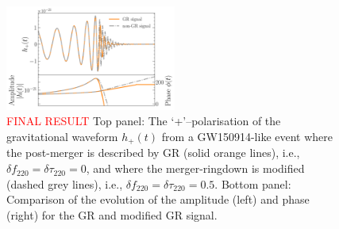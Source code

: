 \documentclass[twocolumn,prd,superscriptaddress,amsfonts,amssymb,amsmath,preprintnumbers]{revtex4-1}
\newcommand{\df}[1]{\delta f_{\text{#1}}}
\newcommand{\dtau}[1]{\delta \tau_{\text{#1}}}
\begin{document}
\begin{figure}
	\includegraphics[width=0.5\textwidth]{figures/modGR_waveforms_amplitudephase.png}
	\caption{\textcolor{red}{FINAL RESULT} Top panel: The `+'--polarisation of the gravitational waveform $h_+(t)$ from a GW150914-like event where the post-merger is described by GR (solid orange lines), i.e., $\df{220} = \dtau{220} = 0$, and where the merger-ringdown is modified (dashed grey lines), i.e., $\df{220} = \dtau{220} = 0.5$. Bottom panel: Comparison of the evolution of the amplitude (left) and phase (right) for the GR and modified GR signal.}
	\label{fig:nongr_waveform}
\end{figure}
\end{document}
